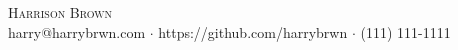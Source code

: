\documentclass[a4paper]{article}
\begin{document}
\vspace*{-10pt}
\begin{center}
	{\Huge \scshape {Harrison Brown}} \\
	harry@harrybrwn.com $\cdot$ https://github.com/harrybrwn $\cdot$ (111) 111-1111 \\
\end{center}
\end{document}
